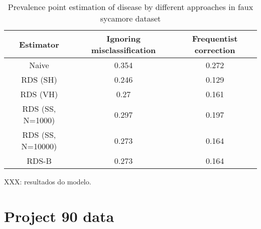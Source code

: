 \begin{table}[htbp]
    \centering
    \caption{\label{tab:results-estimators-faux-sycamore-data}Prevalence point estimation of
    disease by different approaches in faux sycamore dataset}
    \begin{tabular}{ccc}
        \hline
        Estimator & Ignoring misclassification & Frequentist correction \\ \hline
        Naive & 0.354 & 0.272 \\
        RDS (SH) & 0.246 & 0.129 \\
        RDS (VH) & 0.27 & 0.161 \\
        RDS (SS, N=1000) & 0.297 & 0.197 \\
        RDS (SS, N=10000) & 0.273 & 0.164 \\
        RDS-B & 0.273 & 0.164 \\ \hline
        \end{tabular}
\end{table}

XXX: resultados do modelo.  

\section{Project 90 data}